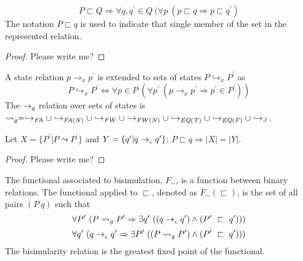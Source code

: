 \begin{lemma}
\label{lem:unique}
$$
P \sqsubset Q \Rightarrow \forall q,q^\prime \in Q\ (\forall p\ (p \sqsubset q \Rightarrow p \sqsubset q^\prime)
$$
The notation $P \sqsubset q$ is used to indicate that single member of
the set in the represented relation.
\end{lemma}
\begin{proof}
Please write me?
\end{proof}
\begin{definition}
\label{def:meta}
A state relation $p \rightarrow_x p^\prime$ is extended to sets of states $P \hookrightarrow_x P^\prime$ as
$$
P \hookrightarrow_x P^\prime \Longleftrightarrow \forall p \in P\ (\forall p^\prime\ (p \rightarrow_x p^\prime \Rightarrow p^\prime \in P^\prime))
$$
The $\rightarrow_{g}$ relation over sets of states is $\leadsto_{g} = \hookrightarrow_\mathit{FA} \cup \hookrightarrow_\mathit{FA(N)} \cup \hookrightarrow_\mathit{FW} \cup \hookrightarrow_\mathit{FW(N)} \cup \hookrightarrow_\mathit{EQ(T)} \cup \hookrightarrow_\mathit{EQ(F)} \cup \hookrightarrow_{J}$.%
\end{definition}

\begin{lemma}
\label{lem:succCount}
Let $X = \{P^\prime | P \leadsto P^\prime\}$ and $Y = \{q^\prime | q
\rightarrow_{\varsigma} q^\prime\}$: $P \sqsubset q \Rightarrow |X| = |Y|$.
\end{lemma}
\begin{proof}
Please write me?
\end{proof}

\begin{definition}
\label{bisimulation}
The functional associated to bisimulation,  $F_\sim$, is a function between binary relations. The functional applied to $\sqsubset$, denoted as $F_\sim(\sqsubset)$, is the set of all pairs
$(P\ q)$ such that
\begin{equation}
\label{eqn:BisimulationForwards}
\forall P^\prime\ ( P \leadsto_{g} P^\prime \Rightarrow \exists q^\prime\ ( (q \rightarrow_{\varsigma} q^\prime )\wedge (P^\prime\ \sqsubset\ q^\prime )))
\end{equation}
\begin{equation}
\label{eqn:BisimulationBackwards}
\forall q^\prime\ ( q \rightarrow_{\varsigma} q^\prime\Rightarrow \exists P^\prime\ ( (P \leadsto_{g} P^\prime )\wedge (P^\prime\ \sqsubset\ q^\prime )))
\end{equation}
The bisimularity relation is the greatest fixed point of the functional.
\end{definition}

